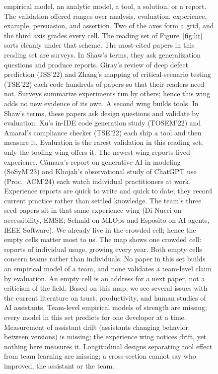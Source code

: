 \begin{figure}[t!]
{\begin{minipage}[t]{\dimexpr0.56\textwidth-2\fboxsep-2\fboxrule}
empirical model, an analytic model, a tool, a solution, or a
report.
The validation offered ranges over analysis, evaluation,
experience, example, persuasion, and assertion.
Two of the axes form a grid, and the third axis grades every
cell.
The reading set of Figure~\ref{fig:lit} sorts cleanly under that
scheme.
The most-cited papers in this reading set are surveys.
In Shaw's terms, they ask generalization questions and produce
reports.
Giray's review of deep defect prediction (JSS'22) and Zhang's
mapping of critical-scenario testing (TSE'22) each code hundreds
of papers so that their readers need not.
Surveys summarize experiments run by others; hence this wing adds
no new evidence of its own.
A second wing builds tools.
In Shaw's terms, these papers ask design questions and validate
by evaluation.
Xu's in-IDE code generation study (TOSEM'22) and Amaral's
compliance checker (TSE'22) each ship a tool and then measure it.
Evaluation is the rarest validation in this reading set; only the
tooling wing offers it.
The newest wing reports lived experience.
C\^amara's report on generative AI in modeling (SoSyM'23) and
Khojah's observational study of ChatGPT use (Proc.\ ACM'24) each
watch individual practitioners at work.
Experience reports are quick to write and quick to date; they
record current practice rather than settled knowledge.
The team's three seed papers sit in that same experience wing
(Di Nucci on accessibility, EMSE; Schmid on MLOps and Esposito on
AI agents, IEEE Software).
We already live in the crowded cell; hence the empty cells matter
most to us.
The map shows one crowded cell: reports of individual usage,
growing every year.
Both empty cells concern teams rather than individuals.
No paper in this set builds an empirical model of a team, and
none validates a team-level claim by evaluation.
An empty cell is an address for a next paper, not a criticism of
the field.
Based on this map, we see several issues with the current
literature on trust, productivity, and human studies of AI
assistants.
Team-level empirical models of strength are missing; every model
in this set predicts for one developer at a time.
Measurement of assistant drift (assistants changing behavior
between versions) is missing; the experience wing notices drift,
yet nothing here measures it.
Longitudinal designs separating tool effect from team learning
are missing; a cross-section cannot say who improved, the
assistant or the team.

\end{minipage}}
\end{figure}
